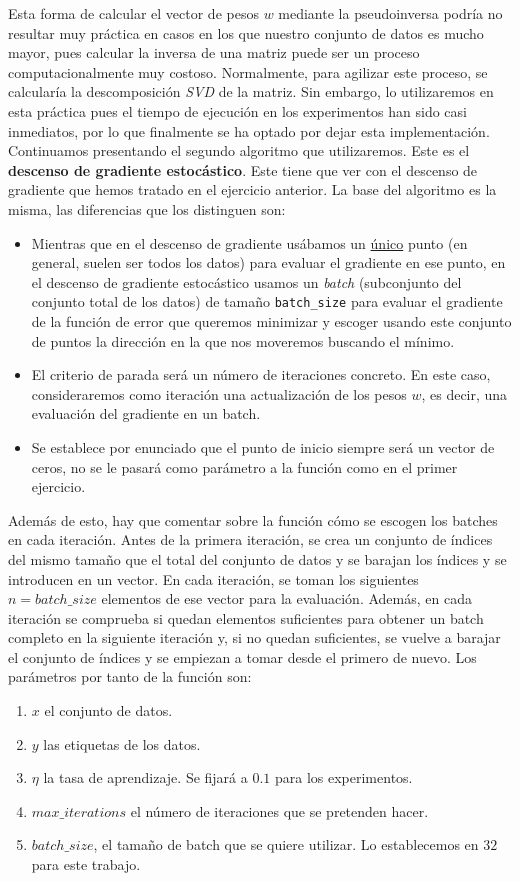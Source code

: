 \documentclass[12pt]{scrartcl}
\begin{document}
{Esta forma de calcular el vector de pesos $w$ mediante la pseudoinversa podría no resultar muy práctica en casos en los que nuestro conjunto de datos es mucho mayor, pues calcular la inversa de una matriz puede ser un proceso computacionalmente
muy costoso. Normalmente, para agilizar este proceso, se calcularía la descomposición \emph{SVD} de la matriz. 
Sin embargo, lo utilizaremos en esta práctica pues el tiempo de ejecución en los experimentos han sido casi inmediatos, por lo que finalmente se ha optado por dejar esta implementación.\\

Continuamos presentando el segundo algoritmo que utilizaremos. Este es el \textbf{descenso de gradiente estocástico}. Este tiene que ver con el descenso de gradiente que hemos tratado en el ejercicio anterior. La base del algoritmo
es la misma, las diferencias que los distinguen son:
\begin{itemize}
  \item Mientras que en el descenso de gradiente usábamos un \underline{único} punto (en general, suelen ser todos los datos) para evaluar el gradiente en ese punto, en el descenso de gradiente estocástico usamos un \emph{batch} (subconjunto del conjunto total de los datos) de tamaño \lstinline{batch_size} para evaluar el gradiente de la función de
  error que queremos minimizar y escoger usando este conjunto de puntos la dirección en la que nos moveremos buscando el mínimo.
  \item El criterio de parada será un número de iteraciones concreto. En este caso, consideraremos como iteración una actualización de los pesos $w$, es decir, una evaluación del gradiente en un batch.
  \item Se establece por enunciado que el punto de inicio siempre será un vector de ceros, no se le pasará como parámetro a la función como en el primer ejercicio.
\end{itemize}

Además de esto, hay que comentar sobre la función cómo se escogen los batches en cada iteración. Antes de la primera iteración, se crea un conjunto de índices del mismo tamaño que el total del conjunto de datos y se barajan los índices y se introducen en un vector. En cada iteración,
se toman los siguientes $n = batch\_size$ elementos de ese vector para la evaluación. Además, en cada iteración se comprueba si quedan elementos suficientes para obtener un batch completo en la siguiente iteración y, si no quedan suficientes, se vuelve a barajar el conjunto de índices y se empiezan
a tomar desde el primero de nuevo. Los parámetros por tanto de la función son:
\begin{enumerate}
  \item $x$ el conjunto de datos.
  \item $y$ las etiquetas de los datos.
  \item $\eta$ la tasa de aprendizaje. Se fijará a $0.1$ para los experimentos.
  \item $max\_iterations$ el número de iteraciones que se pretenden hacer.
  \item $batch\_size$, el tamaño de batch que se quiere utilizar. Lo establecemos en $32$ para este trabajo.
\end{enumerate}

}
\end{document}

